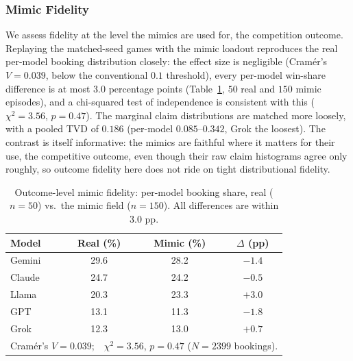 \subsubsection{Mimic Fidelity}
\label{sec:dec5-fidelity}
We assess fidelity at the level the mimics are used for, the competition outcome. Replaying the matched-seed games with the mimic loadout reproduces the real per-model booking distribution closely: the effect size is negligible (Cram\'er's $V = 0.039$, below the conventional $0.1$ threshold), every per-model win-share difference is at most $3.0$ percentage points (Table~\ref{tab:dec5_fidelity}, $50$ real and $150$ mimic episodes), and a chi-squared test of independence is consistent with this ($\chi^2 = 3.56$, $p = 0.47$). The marginal claim distributions are matched more loosely, with a pooled TVD of $0.186$ (per-model $0.085$--$0.342$, Grok the loosest). The contrast is itself informative: the mimics are faithful where it matters for their use, the competitive outcome, even though their raw claim histograms agree only roughly, so outcome fidelity here does not ride on tight distributional fidelity.

\begin{table}[htbp]
\caption{Outcome-level mimic fidelity: per-model booking share, real ($n=50$) vs.\ the mimic field ($n=150$). All differences are within $3.0$ pp.}
\label{tab:dec5_fidelity}
\centering
\begin{tabular}{lccc}
\hline
Model & Real (\%) & Mimic (\%) & $\Delta$ (pp) \\
\hline
Gemini & 29.6 & 28.2 & $-1.4$ \\
Claude & 24.7 & 24.2 & $-0.5$ \\
Llama & 20.3 & 23.3 & $+3.0$ \\
GPT   & 13.1 & 11.3 & $-1.8$ \\
Grok  & 12.3 & 13.0 & $+0.7$ \\
\hline
\multicolumn{4}{l}{Cram\'er's $V = 0.039$;\ \ $\chi^2 = 3.56$, $p = 0.47$ ($N=2399$ bookings).} \\
\hline
\end{tabular}
\end{table}

